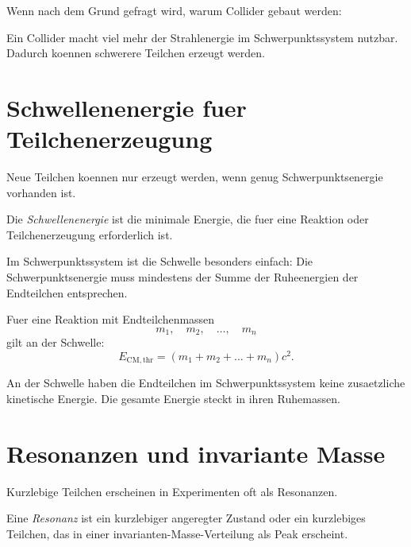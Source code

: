 \begin{examtipbox}
Wenn nach dem Grund gefragt wird, warum Collider gebaut werden:

Ein Collider macht viel mehr der Strahlenergie im Schwerpunktssystem nutzbar.
Dadurch koennen schwerere Teilchen erzeugt werden.
\end{examtipbox}

\section{Schwellenenergie fuer Teilchenerzeugung}

Neue Teilchen koennen nur erzeugt werden, wenn genug Schwerpunktsenergie vorhanden ist.

\begin{definitionbox}
Die \emph{Schwellenenergie} ist die minimale Energie, die fuer eine Reaktion oder
Teilchenerzeugung erforderlich ist.
\end{definitionbox}

\begin{conceptbox}
Im Schwerpunktssystem ist die Schwelle besonders einfach:
Die Schwerpunktsenergie muss mindestens der Summe der Ruheenergien der Endteilchen
entsprechen.
\end{conceptbox}

\begin{formulabox}
Fuer eine Reaktion mit Endteilchenmassen
\[
    m_1,\quad m_2,\quad \ldots,\quad m_n
\]
gilt an der Schwelle:
\[
    E_{\mathrm{CM,thr}}
    =
    \left(
        m_1+m_2+\ldots+m_n
    \right)c^2.
\]
\end{formulabox}

\begin{conceptbox}
An der Schwelle haben die Endteilchen im Schwerpunktssystem keine zusaetzliche
kinetische Energie.
Die gesamte Energie steckt in ihren Ruhemassen.
\end{conceptbox}

\section{Resonanzen und invariante Masse}

Kurzlebige Teilchen erscheinen in Experimenten oft als Resonanzen.

\begin{definitionbox}
Eine \emph{Resonanz} ist ein kurzlebiger angeregter Zustand oder ein kurzlebiges
Teilchen, das in einer invarianten-Masse-Verteilung als Peak erscheint.
\end{definitionbox}

